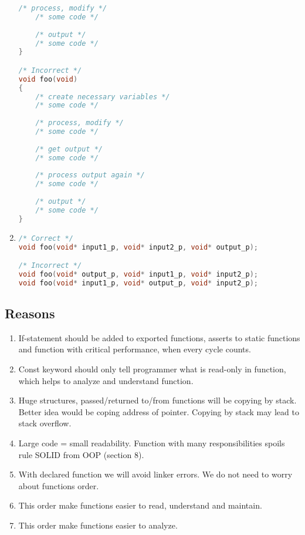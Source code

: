 \begin{enumerate}
\begin{lstlisting}[language=C,style=C99]
    /* process, modify */
    /* some code */
    
    /* output */
    /* some code */
}

/* Incorrect */
void foo(void)
{
    /* create necessary variables */
    /* some code */
    
    /* process, modify */
    /* some code */
    
    /* get output */
    /* some code */
    
    /* process output again */
    /* some code */
    
    /* output */
    /* some code */
}
\end{lstlisting} 

    \item 
\begin{lstlisting}[language=C,style=C99]
/* Correct */
void foo(void* input1_p, void* input2_p, void* output_p);

/* Incorrect */
void foo(void* output_p, void* input1_p, void* input2_p);
void foo(void* input1_p, void* output_p, void* input2_p);
\end{lstlisting}
\end{enumerate}

\subsection{Reasons}
\begin{enumerate}
    \item If-statement should be added to exported functions, asserts to static functions and function with critical performance, when every cycle counts.
    \item Const keyword should only tell programmer what is read-only in function, which helps to analyze and understand function.
    \item Huge structures, passed/returned to/from functions will be copying by stack. Better idea would be coping address of pointer. Copying by stack may lead to stack overflow.
    \item Large code = small readability. Function with many responsibilities spoils rule SOLID from OOP (section 8).
    \item With declared function we will avoid linker errors. We do not need to worry about functions order.
    \item This order make functions easier to read, understand and maintain.
    \item This order make functions easier to analyze. 
\end{enumerate}